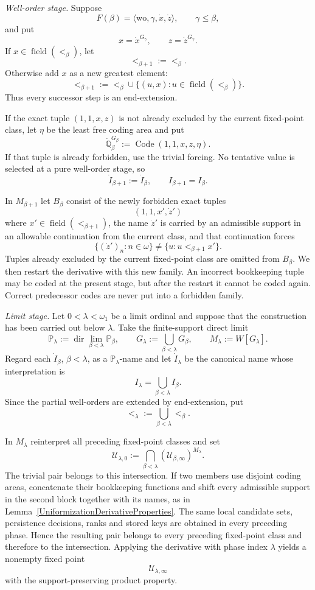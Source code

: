 \documentclass[a4paper,11pt]{article}
\newcommand{\forceP}{\mathbb{P}}
\newcommand{\forceQ}{\mathbb{Q}}
\begin{document}
\medskip
\noindent
\emph{Well-order stage.}
Suppose
\[
F(\beta)=\langle\mathrm{wo},\gamma,\dot x,\dot z\rangle,
\qquad \gamma\leq\beta,
\]
and put
\[
x=\dot x^{G_\gamma},\qquad
z=\dot z^{G_\gamma}.
\]
If $x\in\operatorname{field}(<_\beta)$, let
\[
<_{\beta+1}:=<_\beta.
\]
Otherwise add $x$ as a new greatest element:
\[
<_{\beta+1}
:=<_\beta\cup\{(u,x):u\in\operatorname{field}(<_\beta)\}.
\]
Thus every successor step is an end-extension.

If the exact tuple $(1,1,x,z)$ is not already excluded by the current fixed-point class, let $\eta$ be the least free coding area and put
\[
\dot{\forceQ}_\beta^{G_\beta}
:=\operatorname{Code}(1,1,x,z,\eta).
\]
If that tuple is already forbidden, use the trivial forcing. No tentative value is selected at a pure well-order stage, so
\[
\dot I_{\beta+1}:=\dot I_\beta,
\qquad
I_{\beta+1}=I_\beta.
\]

In $M_{\beta+1}$ let $B_\beta$ consist of the newly forbidden exact tuples
\[
(1,1,x',\dot z')
\]
where $x'\in\operatorname{field}(<_{\beta+1})$, the name $\dot z'$ is carried by an admissible support in an allowable continuation from the current class, and that continuation forces
\[
\{(\dot z')_n:n\in\omega\}
\neq
\{u:u<_{\beta+1}x'\}.
\]
Tuples already excluded by the current fixed-point class are omitted from $B_\beta$. We then restart the derivative with this new family. An incorrect bookkeeping tuple may be coded at the present stage, but after the restart it cannot be coded again. Correct predecessor codes are never put into a forbidden family.

\medskip
\noindent
\emph{Limit stage.}
Let $0<\lambda<\omega_1$ be a limit ordinal and suppose that the construction has been carried out below $\lambda$. Take the finite-support direct limit
\[
\forceP_\lambda
:=\operatorname{dir}\lim_{\beta<\lambda}\forceP_\beta,
\qquad
G_\lambda:=\bigcup_{\beta<\lambda}G_\beta,
\qquad
M_\lambda:=W[G_\lambda].
\]
Regard each $\dot I_\beta$, $\beta<\lambda$, as a $\forceP_\lambda$-name and let $\dot I_\lambda$ be the canonical name whose interpretation is
\[
I_\lambda=\bigcup_{\beta<\lambda}I_\beta.
\]
Since the partial well-orders are extended by end-extension, put
\[
<_\lambda:=\bigcup_{\beta<\lambda}<_\beta.
\]

In $M_\lambda$ reinterpret all preceding fixed-point classes and set
\[
\mathcal U_{\lambda,0}
:=
\bigcap_{\beta<\lambda}(\mathcal U_{\beta,\infty})^{M_\lambda}.
\]
The trivial pair belongs to this intersection. If two members use disjoint coding areas, concatenate their bookkeeping functions and shift every admissible support in the second block together with its names, as in Lemma~\ref{UniformizationDerivativeProperties}. The same local candidate sets, persistence decisions, ranks and stored keys are obtained in every preceding phase. Hence the resulting pair belongs to every preceding fixed-point class and therefore to the intersection. Applying the derivative with phase index $\lambda$ yields a nonempty fixed point
\[
\mathcal U_{\lambda,\infty}
\]
with the support-preserving product property.
\end{document}

